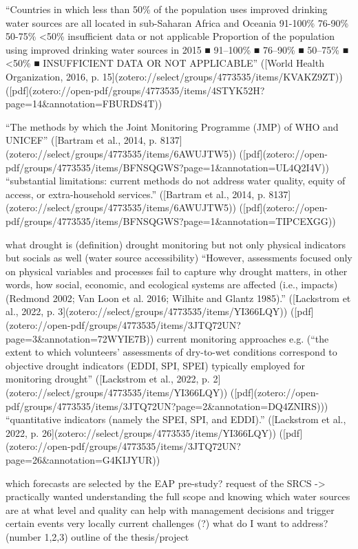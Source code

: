 
“Countries in which less than 50\% of the population uses improved drinking water sources are all located in sub-Saharan Africa and Oceania 91-100\% 76-90\% 50-75\% <50\% insufficient data or not applicable Proportion of the population using improved drinking water sources in 2015 ■ 91–100\% ■ 76–90\% ■ 50–75\% ■ <50\% ■ INSUFFICIENT DATA OR NOT APPLICABLE” ([World Health Organization, 2016, p. 15](zotero://select/groups/4773535/items/KVAKZ9ZT)) ([pdf](zotero://open-pdf/groups/4773535/items/4STYK52H?page=14\&annotation=FBURDS4T))

“The methods by which the Joint Monitoring Programme (JMP) of WHO and UNICEF” ([Bartram et al., 2014, p. 8137](zotero://select/groups/4773535/items/6AWUJTW5)) ([pdf](zotero://open-pdf/groups/4773535/items/BFNSQGWS?page=1&annotation=UL4Q2I4V))
“substantial limitations: current methods do not address water quality, equity of access, or extra-household services.” ([Bartram et al., 2014, p. 8137](zotero://select/groups/4773535/items/6AWUJTW5)) ([pdf](zotero://open-pdf/groups/4773535/items/BFNSQGWS?page=1&annotation=TIPCEXGG))



what drought is (definition)
drought monitoring but not only physical indicators but socials as well (water source accessibility) “However, assessments focused only on physical variables and processes fail to capture why drought matters, in other words, how social, economic, and ecological systems are affected (i.e., impacts) (Redmond 2002; Van Loon et al. 2016; Wilhite and Glantz 1985).” ([Lackstrom et al., 2022, p. 3](zotero://select/groups/4773535/items/YI366LQY)) ([pdf](zotero://open-pdf/groups/4773535/items/3JTQ72UN?page=3\&annotation=72WYIE7B))
current monitoring approaches e.g. (“the extent to which volunteers’ assessments of dry-to-wet conditions correspond to objective drought indicators (EDDI, SPI, SPEI) typically employed for monitoring drought” ([Lackstrom et al., 2022, p. 2](zotero://select/groups/4773535/items/YI366LQY)) ([pdf](zotero://open-pdf/groups/4773535/items/3JTQ72UN?page=2\&annotation=DQ4ZNIRS)))
“quantitative indicators (namely the SPEI, SPI, and EDDI).” ([Lackstrom et al., 2022, p. 26](zotero://select/groups/4773535/items/YI366LQY)) ([pdf](zotero://open-pdf/groups/4773535/items/3JTQ72UN?page=26\&annotation=G4KIJYUR))

which forecasts are selected by the EAP pre-study?
request of the SRCS -> practically wanted
understanding the full scope and knowing which water sources are at what level and quality can help with management decisions and trigger certain events very locally
current challenges (?) what do I want to address? (number 1,2,3)
outline of the thesis/project

